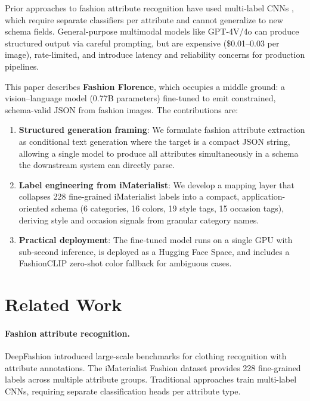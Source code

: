 \documentclass[10pt,twocolumn]{article}
\begin{document}
Prior approaches to fashion attribute recognition have used multi-label CNNs
\citep{liu2016deepfashion, guo2019imaterialist}, which require separate
classifiers per attribute and cannot generalize to new schema fields.
General-purpose multimodal models like GPT-4V/4o can produce structured
output via careful prompting, but are expensive (\$0.01--0.03 per image),
rate-limited, and introduce latency and reliability concerns for production
pipelines.

This paper describes \textbf{Fashion Florence}, which occupies a middle
ground: a vision--language model (0.77B parameters) fine-tuned to emit
constrained, schema-valid JSON from fashion images.  The contributions are:

\begin{enumerate}[leftmargin=*,topsep=2pt,itemsep=1pt]
\item \textbf{Structured generation framing}: We formulate fashion attribute
  extraction as conditional text generation where the target is a compact
  JSON string, allowing a single model to produce all attributes
  simultaneously in a schema the downstream system can directly parse.

\item \textbf{Label engineering from iMaterialist}: We develop a mapping
  layer that collapses 228 fine-grained iMaterialist labels into a compact,
  application-oriented schema (6 categories, 16 colors, 19 style tags, 15
  occasion tags), deriving style and occasion signals from granular category
  names.

\item \textbf{Practical deployment}: The fine-tuned model runs on a single
  GPU with sub-second inference, is deployed as a Hugging Face Space, and
  includes a FashionCLIP zero-shot color fallback for ambiguous cases.
\end{enumerate}

\section{Related Work}
\label{sec:related}

\paragraph{Fashion attribute recognition.}
DeepFashion \citep{liu2016deepfashion} introduced large-scale benchmarks for
clothing recognition with attribute annotations.  The iMaterialist Fashion
dataset \citep{guo2019imaterialist} provides 228 fine-grained labels across
multiple attribute groups.  Traditional approaches train multi-label CNNs,
requiring separate classification heads per attribute type.
\end{document}
